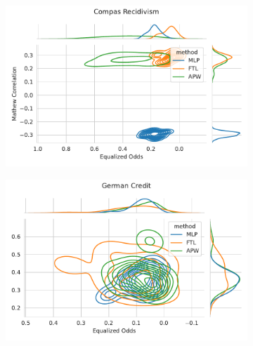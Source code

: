 \begin{figure}
\begin{subfigure}{.45\linewidth}
    \includegraphics[width=1\linewidth]{images/pareto_mcc_odds_compas.pdf}
\end{subfigure}
\begin{subfigure}{.45\linewidth}
    \includegraphics[width=1\linewidth]{images/pareto_mcc_odds_german.pdf}
\end{subfigure}
\end{figure}


